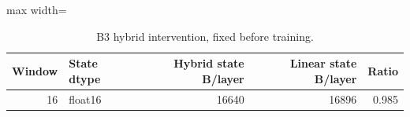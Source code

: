 \begin{table}[!htb]
\centering
\scriptsize
\setlength{\tabcolsep}{3.5pt}
\caption{B3 hybrid intervention, fixed before training.}
\label{tab:t2bb3}
\begin{adjustbox}{max width=\linewidth}
\begin{tabular}{rlrrr}
\toprule
Window & State dtype & Hybrid state B/layer & Linear state B/layer & Ratio \\
\midrule
16 & float16 & 16640 & 16896 & 0.985 \\
\bottomrule
\end{tabular}
\end{adjustbox}
\end{table}
